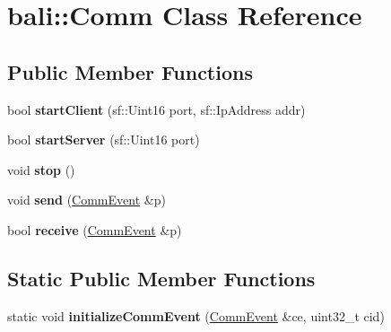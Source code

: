 \hypertarget{classbali_1_1_comm}{\section{bali\-:\-:Comm Class Reference}
\label{classbali_1_1_comm}
}
\subsection*{Public Member Functions}
\begin{DoxyCompactItemize}
\item 
\hypertarget{classbali_1_1_comm_ae569bdd763975a2497e35c8008d0ac66}{bool {\bfseries start\-Client} (sf\-::\-Uint16 port, sf\-::\-Ip\-Address addr)}\label{classbali_1_1_comm_ae569bdd763975a2497e35c8008d0ac66}

\item 
\hypertarget{classbali_1_1_comm_a2a761a2615ae44e713d45b5eec53c4d0}{bool {\bfseries start\-Server} (sf\-::\-Uint16 port)}\label{classbali_1_1_comm_a2a761a2615ae44e713d45b5eec53c4d0}

\item 
\hypertarget{classbali_1_1_comm_aa33c2f2b39719598e5ae773df3353259}{void {\bfseries stop} ()}\label{classbali_1_1_comm_aa33c2f2b39719598e5ae773df3353259}

\item 
\hypertarget{classbali_1_1_comm_a37a8581d204065f5f575322ddd4c26c6}{void {\bfseries send} (\hyperlink{classbali_1_1_comm_event}{Comm\-Event} \&p)}\label{classbali_1_1_comm_a37a8581d204065f5f575322ddd4c26c6}

\item 
\hypertarget{classbali_1_1_comm_a4849c7d714e7f35ea2d5f021f488102a}{bool {\bfseries receive} (\hyperlink{classbali_1_1_comm_event}{Comm\-Event} \&p)}\label{classbali_1_1_comm_a4849c7d714e7f35ea2d5f021f488102a}

\end{DoxyCompactItemize}
\subsection*{Static Public Member Functions}
\begin{DoxyCompactItemize}
\item 
\hypertarget{classbali_1_1_comm_a132144d7c1d8045f2dd37907e0f3f3fb}{static void {\bfseries initialize\-Comm\-Event} (\hyperlink{classbali_1_1_comm_event}{Comm\-Event} \&ce, uint32\-\_\-t cid)}\label{classbali_1_1_comm_a132144d7c1d8045f2dd37907e0f3f3fb}

\end{DoxyCompactItemize}
